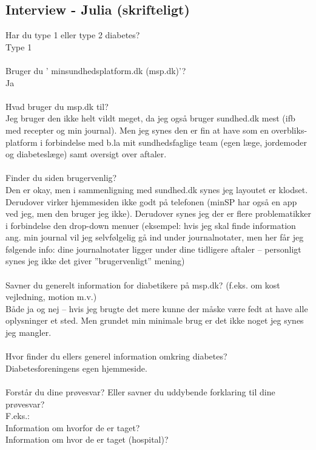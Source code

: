 \documentclass[english]{article}
\begin{document}
\subsection*{Interview - Julia (skrifteligt)}
Har du type 1 eller type 2 diabetes?\\
Type 1 
\\ \\
Bruger  du ’ minsundhedsplatform.dk (msp.dk)’?\\
Ja   
\\ \\
Hvad bruger du msp.dk til?\\
Jeg bruger den ikke helt vildt meget, da jeg også bruger sundhed.dk mest (ifb med recepter og min journal). Men jeg synes den er fin at have som en overbliks-platform i forbindelse med b.la mit sundhedsfaglige team (egen læge, jordemoder og diabeteslæge) samt oversigt over aftaler.
\\ \\
Finder du siden brugervenlig?\\
Den er okay, men i sammenligning med sundhed.dk synes jeg layoutet er klodset. Derudover virker hjemmesiden ikke godt på telefonen (minSP har også en app ved jeg, men den bruger jeg ikke). Derudover synes jeg der er flere problematikker i forbindelse den drop-down menuer (eksempel: hvis jeg skal finde information ang. min journal vil jeg selvfølgelig gå ind under journalnotater, men her får jeg følgende info: dine journalnotater ligger under  dine tidligere aftaler – personligt synes jeg ikke det giver ”brugervenligt” mening)
\\ \\
Savner du generelt information for diabetikere på msp.dk? (f.eks. om kost vejledning, motion m.v.)\\
Både ja og nej – hvis jeg brugte det mere kunne der måske være fedt at have alle oplysninger et sted. Men grundet min minimale brug er det ikke noget jeg synes jeg mangler.
\\ \\
Hvor finder du ellers generel information omkring diabetes?\\
Diabetesforeningens egen hjemmeside. 
\\ \\
Forstår du dine prøvesvar? Eller savner du uddybende forklaring til dine prøvesvar?\\
             F.eks.:  \\
             Information om hvorfor de er taget?  \\
             Information om hvor de er taget (hospital)?\\
\end{document}
